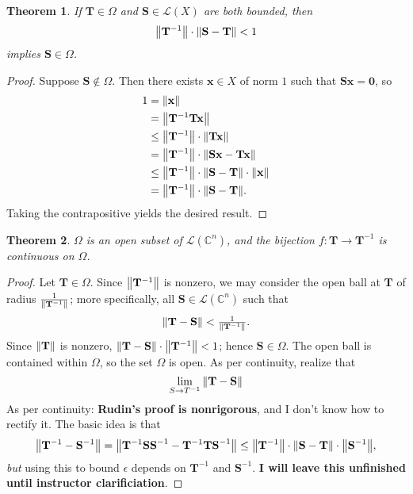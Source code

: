 \documentclass[11pt]{article}
\renewcommand{\vec}[1]{\mathbf{#1}}
\newcommand{\mat}[1]{\mathbf{#1}}
\newtheorem{theorem}{Theorem}
\begin{document}
\begin{theorem}
	If $\mat{T} \in \Omega$ and $\mat{S} \in \mathcal{L}(X)$ are both bounded, then
	\[
		\norm{\mat{T}^{-1}} \cdot \norm{\mat{S} - \mat{T}} < 1
	\]
	implies $\mat{S} \in \Omega$.
\end{theorem}
\begin{adjustwidth}{0.5cm}{}
	\begin{proof}
		Suppose $\mat{S} \notin \Omega$. Then there exists $\vec{x} \in X$ of norm $1$ such that $\mat{S} \vec{x} = \vec{0}$, so
		\begin{align*}
			1 &= \norm{\vec{x}} \\
			&= \norm{\mat{T}^{-1}\mat{T} \vec{x}} \\
			&\le \norm{\mat{T}^{-1}} \cdot \norm{\mat{T} \vec{x}} \\
			&= \norm{\mat{T}^{-1}} \cdot \norm{\mat{S} \vec{x} - \mat{T} \vec{x}} \\
			&\le \norm{\mat{T}^{-1}} \cdot \norm{\mat{S} - \mat{T}} \cdot \norm{\vec{x}} \\
			&= \norm{\mat{T}^{-1}} \cdot \norm{\mat{S} - \mat{T}}.
		\end{align*}
		Taking the contrapositive yields the desired result.
	\end{proof}
\end{adjustwidth}

\newpage

\begin{theorem}
	$\Omega$ is an open subset of $\mathcal{L}(\mathbb{C}^{n})$, and the bijection $f : \mat{T} \to \mat{T}^{-1}$ is continuous on $\Omega$.
\end{theorem}
\begin{adjustwidth}{0.5cm}{}
	\begin{proof}
		Let $\mat{T} \in \Omega$. Since $\norm{\mat{T}^{-1}}$ is nonzero, we may consider the open ball at $\mat{T}$ of radius $\tfrac{1}{\norm{\mat{T}^{-1}}}$; more specifically, all $\mat{S} \in \mathcal{L}(\mathbb{C}^{n})$ such that
		\[
			\norm{\mat{T} - \mat{S}} < \tfrac{1}{\norm{\mat{T}^{-1}}}.
		\]
		Since $\norm{\mat{T}}$ is nonzero, $\norm{\mat{T} - \mat{S}} \cdot \norm{\mat{T}^{-1}} < 1$; hence $\mat{S} \in \Omega$. The open ball is contained within $\Omega$, so the set $\Omega$ is open. As per continuity, realize that
		\[
			\lim\limits_{S \to T^{-1}} \norm{\mat{T} - \mat{S}}
		\]
		As per continuity: \textbf{Rudin's proof is nonrigorous}, and I don't know how to rectify it. The basic idea is that
		\[
			\norm{\mat{T}^{-1} - \mat{S}^{-1}} = \norm{\mat{T}^{-1}\mat{SS}^{-1} - \mat{T}^{-1}\mat{TS}^{-1}} \le \norm{\mat{T}^{-1}} \cdot \norm{\mat{S} - \mat{T}} \cdot \norm{\mat{S}^{-1}},
		\]
		\textit{but} using this to bound $\epsilon$ depends on $\mat{T}^{-1}$ and $\mat{S}^{-1}$. \textbf{I will leave this unfinished until instructor clarificiation}.
	\end{proof}
\end{adjustwidth}
\end{document}
